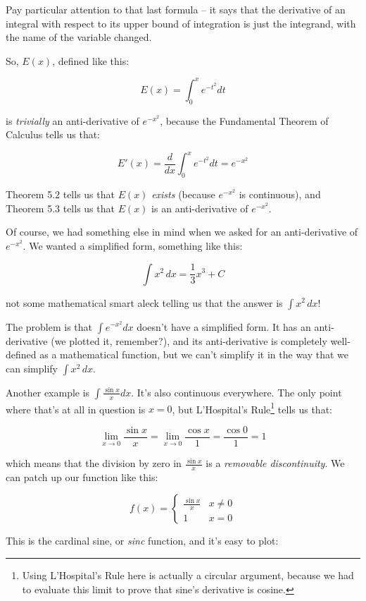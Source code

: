 Pay particular attention to that last formula -- it says that the derivative of an integral with respect
to its upper bound of integration is just the integrand, with the name of the variable changed.

So, $E(x)$, defined like this:

$$E(x) = \int_0^x e^{-t^2} dt$$

is {\it trivially} an anti-derivative of $e^{-x^2}$, because the Fundamental Theorem of Calculus tells us that:

$$E'(x) = \frac{d}{dx} \int_0^x e^{-t^2} dt = e^{-x^2}$$

\cite{briggs} Theorem 5.2 tells us that $E(x)$ {\it exists} (because $e^{-x^2}$ is continuous), and \cite{briggs} Theorem 5.3 tells
us that $E(x)$ is an anti-derivative of $e^{-x^2}$.

Of course, we had something else in mind when we asked for an anti-derivative of $e^{-x^2}$.  We wanted
a simplified form, something like this:

$$\int x^2\,dx = \frac{1}{3} x^3 + C$$

not some mathematical smart aleck telling us that the answer is $\int x^2\,dx$!

The problem is that $\int e^{-x^2} dx$ doesn't have a simplified form.  It has an anti-derivative
(we plotted it, remember?), and its anti-derivative is completely well-defined as a mathematical function, but we
can't simplify it in the way that we can simplify $\int x^2\,dx$.

Another example is $\int \frac{\sin x}{x} dx$.  It's also continuous everywhere.  The only point
where that's at all in question is $x=0$, but L'Hospital's Rule\footnote{Using L'Hospital's Rule here is actually
a circular argument, because we had to evaluate this limit to prove that sine's derivative is cosine.} tells us that:

$$\lim_{x\to 0} \frac{\sin x}{x} = \lim_{x\to 0} \frac{\cos x}{1} = \frac{\cos 0}{1} = 1$$

which means that the division by zero in $\frac{\sin x}{x}$ is a {\it removable discontinuity}.
We can patch up our function like this:

\[ f(x) = \begin{cases} 
      \frac{\sin x}{x} & x \ne 0 \\
      1 & x = 0
   \end{cases}
\]

This is the cardinal sine, or {\it sinc} function, and it's easy to plot:

